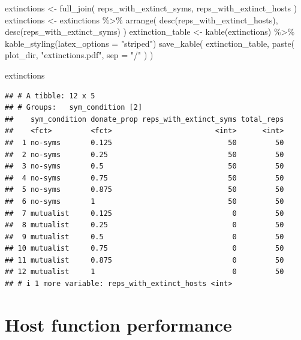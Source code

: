 \documentclass[
]{book}
\newenvironment{Shaded}{\begin{snugshade}}{\end{snugshade}}
\newcommand{\AttributeTok}[1]{\textcolor[rgb]{0.77,0.63,0.00}{#1}}
\newcommand{\FunctionTok}[1]{\textcolor[rgb]{0.00,0.00,0.00}{#1}}
\newcommand{\NormalTok}[1]{#1}
\newcommand{\OtherTok}[1]{\textcolor[rgb]{0.56,0.35,0.01}{#1}}
\newcommand{\SpecialCharTok}[1]{\textcolor[rgb]{0.00,0.00,0.00}{#1}}
\newcommand{\StringTok}[1]{\textcolor[rgb]{0.31,0.60,0.02}{#1}}
\begin{document}
\begin{Shaded}
\begin{Highlighting}[]
\NormalTok{extinctions }\OtherTok{\textless{}{-}} \FunctionTok{full\_join}\NormalTok{(}
\NormalTok{  reps\_with\_extinct\_syms,}
\NormalTok{  reps\_with\_extinct\_hosts}
\NormalTok{)}
\NormalTok{extinctions }\OtherTok{\textless{}{-}}\NormalTok{ extinctions }\SpecialCharTok{\%\textgreater{}\%}
  \FunctionTok{arrange}\NormalTok{(}
    \FunctionTok{desc}\NormalTok{(reps\_with\_extinct\_hosts), }\FunctionTok{desc}\NormalTok{(reps\_with\_extinct\_syms)}
\NormalTok{  )}
\NormalTok{extinction\_table }\OtherTok{\textless{}{-}} \FunctionTok{kable}\NormalTok{(extinctions) }\SpecialCharTok{\%\textgreater{}\%}
  \FunctionTok{kable\_styling}\NormalTok{(}\AttributeTok{latex\_options =} \StringTok{"striped"}\NormalTok{)}
\FunctionTok{save\_kable}\NormalTok{(}
\NormalTok{  extinction\_table,}
  \FunctionTok{paste}\NormalTok{(}
\NormalTok{    plot\_dir,}
    \StringTok{"extinctions.pdf"}\NormalTok{,}
    \AttributeTok{sep =} \StringTok{"/"}
\NormalTok{  )}
\NormalTok{)}

\NormalTok{extinctions}
\end{Highlighting}
\end{Shaded}

\begin{verbatim}
## # A tibble: 12 x 5
## # Groups:   sym_condition [2]
##    sym_condition donate_prop reps_with_extinct_syms total_reps
##    <fct>         <fct>                        <int>      <int>
##  1 no-syms       0.125                           50         50
##  2 no-syms       0.25                            50         50
##  3 no-syms       0.5                             50         50
##  4 no-syms       0.75                            50         50
##  5 no-syms       0.875                           50         50
##  6 no-syms       1                               50         50
##  7 mutualist     0.125                            0         50
##  8 mutualist     0.25                             0         50
##  9 mutualist     0.5                              0         50
## 10 mutualist     0.75                             0         50
## 11 mutualist     0.875                            0         50
## 12 mutualist     1                                0         50
## # i 1 more variable: reps_with_extinct_hosts <int>
\end{verbatim}

\hypertarget{host-function-performance-3}{%
\section{Host function performance}\label{host-function-performance-3}}
\end{document}
